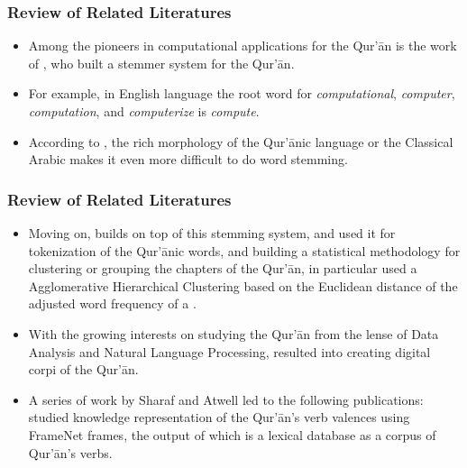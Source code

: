 \documentclass{beamer}
\theoremstyle{definition}
\begin{document}
\begin{frame}[t, fragile]\justifying
    \frametitle{Review of Related Literatures}
    \begin{itemize}
        \item Among the pioneers in computational applications for the Qur'\=an is the work of \cite{thabet2004}, who built a stemmer system for the Qur'\=an. \pause
        \item For example, in English language the root word for \textit{computational}, \textit{computer}, \textit{computation}, and \textit{computerize} is \textit{compute}. 
        \item According to \cite{thabet2004}, the rich morphology of the Qur'\=anic language or the Classical Arabic makes it even more difficult to do word stemming. 
    \end{itemize}
\end{frame}

\begin{frame}[t, fragile]\justifying
\frametitle{Review of Related Literatures}
\begin{itemize}
\item Moving on, \cite{thabet2005} builds on top of this stemming system, and used it for tokenization of the Qur'\=anic words, and building a statistical methodology for clustering or grouping the chapters of the Qur'\=an, in particular \cite{thabet2005} used a Agglomerative Hierarchical Clustering based on the Euclidean distance of the adjusted word frequency of a  .
\item With the growing interests on studying the Qur'\=an from the lense of Data Analysis and Natural Language Processing, resulted into creating digital corpi of the Qur'\=an.
\item A series of work by Sharaf and Atwell led to the following publications: \cite{sharaf2009} studied knowledge representation of the Qur'\=an's verb valences using FrameNet frames, the output of which is a lexical database as a corpus of Qur'\=an's verbs. 
\end{itemize}
\end{frame}
\end{document}
